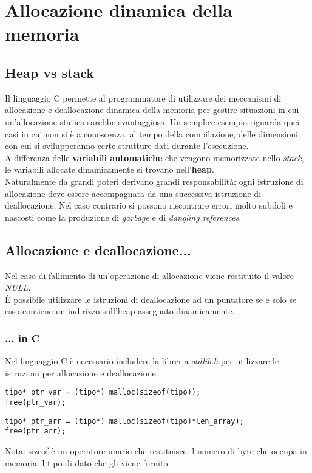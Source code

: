 \chapter{Allocazione dinamica della memoria}\label{memoriaDin}
\section{Heap vs stack}
Il linguaggio C permette al programmatore di utilizzare dei meccanismi di allocazione e deallocazione dinamica della memoria per gestire situazioni in cui un’allocazione statica sarebbe svantaggiosa. Un semplice esempio riguarda quei casi in cui non si è a conoscenza, al tempo della compilazione, delle dimensioni con cui si svilupperanno certe strutture dati durante l'esecuzione.\\
A differenza delle \textbf{variabili automatiche} che vengono memorizzate nello \textit{stack}, le variabili allocate dinamicamente si trovano nell'\textbf{heap}.\\
Naturalmente da grandi poteri derivano grandi responsabilità: ogni istruzione di allocazione deve essere accompagnata da una successiva istruzione di deallocazione. Nel caso contrario si possono riscontrare errori molto subdoli e nascosti come la produzione di \textit{garbage} e di \textit{dangling references}.

\section{Allocazione e deallocazione...}
Nel caso di fallimento di un'operazione di allocazione viene restituito il valore \textit{NULL}.\\
\`{E} possibile utilizzare le istruzioni di deallocazione ad un puntatore se e solo se esso contiene un indirizzo sull'heap assegnato dinamicamente.
\subsection{... in C}
Nel linguaggio C è necessario includere la libreria \textit{stdlib.h} per utilizzare le istruzioni per allocazione e deallocazione:
\begin{lstlisting}[title={Allocazione e deallocazione dinamica di una variabile in C}]
tipo* ptr_var = (tipo*) malloc(sizeof(tipo));
free(ptr_var);
\end{lstlisting}
\begin{lstlisting}[title={Allocazione e deallocazione dinamica di un vettore in C}]
tipo* ptr_arr = (tipo*) malloc(sizeof(tipo)*len_array);
free(ptr_arr);
\end{lstlisting}
Nota: \colorbox{light-gray}{sizeof} è un operatore unario che restituisce il numero di byte che occupa in memoria il tipo di dato che gli viene fornito.

